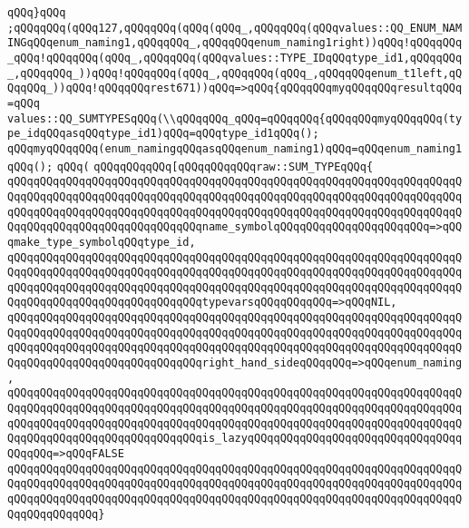 \verb|qQQq}qQQq|\newline
\verb|;qQQqqQQq(qQQq127,qQQqqQQq(qQQq(qQQq_,qQQqqQQq(qQQqvalues::QQ_ENUM_NAMINGqQQqenum_naming1,qQQqqQQq_,qQQqqQQqenum_naming1right))qQQq!qQQqqQQq_qQQq!qQQqqQQq(qQQq_,qQQqqQQq(qQQqvalues::TYPE_IDqQQqtype_id1,qQQqqQQq_,qQQqqQQq_))qQQq!qQQqqQQq(qQQq_,qQQqqQQq(qQQq_,qQQqqQQqenum_t1left,qQQqqQQq_))qQQq!qQQqqQQqrest671))qQQq=>qQQq{qQQqqQQqmyqQQqqQQqresultqQQq=qQQq|\newline
\verb|values::QQ_SUMTYPESqQQq(\\qQQqqQQq_qQQq=qQQqqQQq{qQQqqQQqmyqQQqqQQq(type_idqQQqasqQQqtype_id1)qQQq=qQQqtype_id1qQQq();|\newline
\verb|qQQqmyqQQqqQQq(enum_namingqQQqasqQQqenum_naming1)qQQq=qQQqenum_naming1qQQq();|\newline
\verb|qQQq(|\newline
\verb|qQQqqQQqqQQq[qQQqqQQqqQQqraw::SUM_TYPEqQQq{|\newline
\verb|qQQqqQQqqQQqqQQqqQQqqQQqqQQqqQQqqQQqqQQqqQQqqQQqqQQqqQQqqQQqqQQqqQQqqQQqqQQqqQQqqQQqqQQqqQQqqQQqqQQqqQQqqQQqqQQqqQQqqQQqqQQqqQQqqQQqqQQqqQQqqQQqqQQqqQQqqQQqqQQqqQQqqQQqqQQqqQQqqQQqqQQqqQQqqQQqqQQqqQQqqQQqqQQqqQQqqQQqqQQqqQQqqQQqqQQqqQQqqQQqname_symbolqQQqqQQqqQQqqQQqqQQqqQQq=>qQQqmake_type_symbolqQQqtype_id,|\newline
\verb|qQQqqQQqqQQqqQQqqQQqqQQqqQQqqQQqqQQqqQQqqQQqqQQqqQQqqQQqqQQqqQQqqQQqqQQqqQQqqQQqqQQqqQQqqQQqqQQqqQQqqQQqqQQqqQQqqQQqqQQqqQQqqQQqqQQqqQQqqQQqqQQqqQQqqQQqqQQqqQQqqQQqqQQqqQQqqQQqqQQqqQQqqQQqqQQqqQQqqQQqqQQqqQQqqQQqqQQqqQQqqQQqqQQqqQQqqQQqqQQqtypevarsqQQqqQQqqQQq=>qQQqNIL,|\newline
\verb|qQQqqQQqqQQqqQQqqQQqqQQqqQQqqQQqqQQqqQQqqQQqqQQqqQQqqQQqqQQqqQQqqQQqqQQqqQQqqQQqqQQqqQQqqQQqqQQqqQQqqQQqqQQqqQQqqQQqqQQqqQQqqQQqqQQqqQQqqQQqqQQqqQQqqQQqqQQqqQQqqQQqqQQqqQQqqQQqqQQqqQQqqQQqqQQqqQQqqQQqqQQqqQQqqQQqqQQqqQQqqQQqqQQqqQQqqQQqqQQqright_hand_sideqQQqqQQq=>qQQqenum_naming,|\newline
\verb|qQQqqQQqqQQqqQQqqQQqqQQqqQQqqQQqqQQqqQQqqQQqqQQqqQQqqQQqqQQqqQQqqQQqqQQqqQQqqQQqqQQqqQQqqQQqqQQqqQQqqQQqqQQqqQQqqQQqqQQqqQQqqQQqqQQqqQQqqQQqqQQqqQQqqQQqqQQqqQQqqQQqqQQqqQQqqQQqqQQqqQQqqQQqqQQqqQQqqQQqqQQqqQQqqQQqqQQqqQQqqQQqqQQqqQQqqQQqqQQqis_lazyqQQqqQQqqQQqqQQqqQQqqQQqqQQqqQQqqQQqqQQq=>qQQqFALSE|\newline
\verb|qQQqqQQqqQQqqQQqqQQqqQQqqQQqqQQqqQQqqQQqqQQqqQQqqQQqqQQqqQQqqQQqqQQqqQQqqQQqqQQqqQQqqQQqqQQqqQQqqQQqqQQqqQQqqQQqqQQqqQQqqQQqqQQqqQQqqQQqqQQqqQQqqQQqqQQqqQQqqQQqqQQqqQQqqQQqqQQqqQQqqQQqqQQqqQQqqQQqqQQqqQQqqQQqqQQqqQQqqQQqqQQq}|\newline
